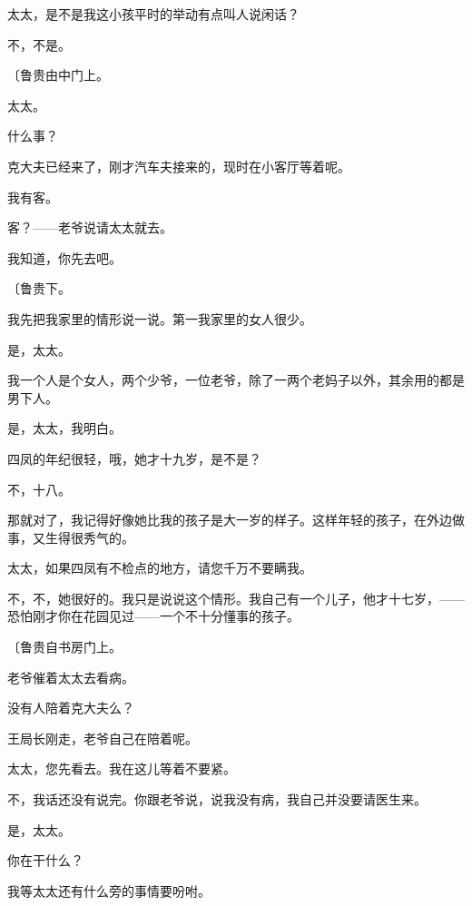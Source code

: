 太太，是不是我这小孩平时的举动有点叫人说闲话？

不，不是。

{\fangsong〔鲁贵由中门上。}

太太。

什么事？

克大夫已经来了，刚才汽车夫接来的，现时在小客厅等着呢。

我有客。

客？——老爷说请太太就去。

我知道，你先去吧。

{\fangsong〔鲁贵下。}

我先把我家里的情形说一说。第一我家里的女人很少。

是，太太。

我一个人是个女人，两个少爷，一位老爷，除了一两个老妈子以外，其余用的都是男下人。

是，太太，我明白。

四凤的年纪很轻，哦，她才十九岁，是不是？

不，十八。

那就对了，我记得好像她比我的孩子是大一岁的样子。这样年轻的孩子，在外边做事，又生得很秀气的。

太太，如果四凤有不检点的地方，请您千万不要瞒我。

不，不，她很好的。我只是说说这个情形。我自己有一个儿子，他才十七岁，——恐怕刚才你在花园见过——一个不十分懂事的孩子。

{\fangsong〔鲁贵自书房门上。}

老爷催着太太去看病。

没有人陪着克大夫么？

王局长刚走，老爷自己在陪着呢。

太太，您先看去。我在这儿等着不要紧。

不，我话还没有说完。你跟老爷说，说我没有病，我自己并没要请医生来。

是，太太。

你在干什么？

我等太太还有什么旁的事情要吩咐。

